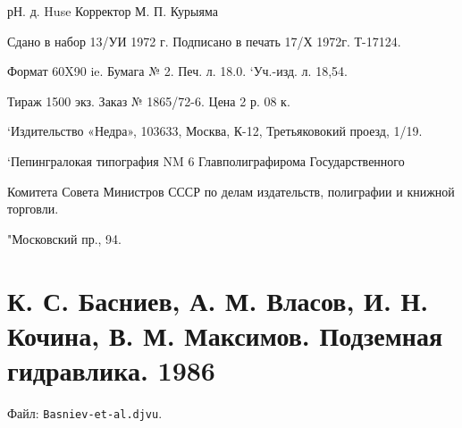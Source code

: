\documentclass[
  11pt,
]{article}
\begin{document}
рН. д. Huse Корректор М. П. Курыяма\par
Сдано в набор 13/УИ 1972 г. Подписано в печать 17/Х 1972г. Т-17124.\par
Формат 60X90 ie. Бумага № 2. Печ. л. 18.0. `Уч.-изд. л. 18,54.\par
\smallskip
Тираж 1500 экз. Заказ № 1865/72-6. Цена 2 р. 08 к.\par
\smallskip
`Издительство «Недра», 103633, Москва, К-12, Третьяковокий проезд, 1/19.\par
`Пепингралокая типография NM 6 Главполиграфирома Государственного\par
Комитета Совета Министров СССР по делам издательств, полиграфии и книжной торговли.\par
"Московский пр., 94.\par
\endgroup


\section{К. С. Басниев, А. М. Власов, И. Н. Кочина, В. М. Максимов. Подземная гидравлика. 1986}\label{section-09}

Файл: \texttt{Basniev-et-al.djvu}.
\end{document}
